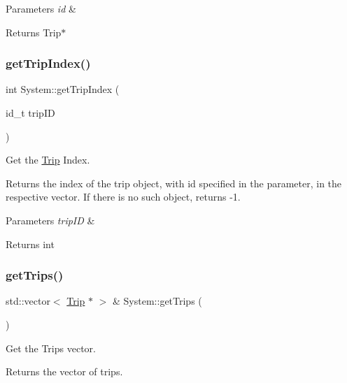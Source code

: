 \begin{DoxyParams}{Parameters}
{\em id} & \\
\hline
\end{DoxyParams}
\begin{DoxyReturn}{Returns}
Trip$\ast$ 
\end{DoxyReturn}
\mbox{\label{classSystem_aa431fdc152458fc39efb9a60e9f62f01}} 
\subsubsection{\texorpdfstring{get\+Trip\+Index()}{getTripIndex()}}
{\footnotesize\ttfamily int System\+::get\+Trip\+Index (\begin{DoxyParamCaption}\item[{id\+\_\+t}]{trip\+ID }\end{DoxyParamCaption})}



Get the \mbox{\hyperlink{classTrip}{Trip}} Index. 

Returns the index of the trip object, with id specified in the parameter, in the respective vector. If there is no such object, returns -\/1.


\begin{DoxyParams}{Parameters}
{\em trip\+ID} & \\
\hline
\end{DoxyParams}
\begin{DoxyReturn}{Returns}
int 
\end{DoxyReturn}
\mbox{\label{classSystem_a97b3ac8c8d84fecbdd2c49df5e4b51bf}} 
\subsubsection{\texorpdfstring{get\+Trips()}{getTrips()}}
{\footnotesize\ttfamily std\+::vector$<$ \mbox{\hyperlink{classTrip}{Trip}} $\ast$ $>$ \& System\+::get\+Trips (\begin{DoxyParamCaption}{ }\end{DoxyParamCaption})}



Get the Trips vector. 

Returns the vector of trips.

